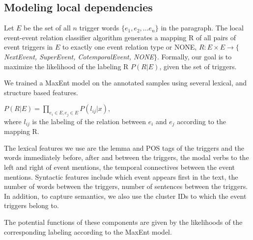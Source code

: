 \subsection{Modeling local dependencies}
Let $E$ be the set of all $n$ trigger words $\{e_1, e_2, ... e_{n}\}$ in the paragraph. The local event-event relation classifier algorithm generates a mapping R of all pairs of event triggers in $E$ to exactly one event relation type or NONE, $R : E \times E \rightarrow \{ $ {\em NextEvent, SuperEvent, CotemporalEvent, NONE}$ \}$. Formally, our goal is to maximize the likelihood of the labeling R $P(R | E)$, given the set of triggers.

We trained a MaxEnt model on the annotated samples using several lexical, and structure based features.

$P(R | E) = \prod_{e_{i}\in E, e_j \in E} P(l_{ij} | x), $\\
where $l_{ij}$ is the labeling of the relation between $e_i$ and $e_j$ according to the mapping R.

The lexical features we use are the lemma and POS tags of the triggers and the words immediately before, after and between the triggers, the modal verbs to the left and right of event mentions, the temporal connectives between the event mentions. Syntactic features include which event appears first in the text, the number of words between the triggers, number of sentences between the triggers. In addition, to capture semantics, we also use the cluster IDs to which the event triggers belong to.

The potential functions of these components are given by the likelihoods of the corresponding labeling according to the MaxEnt model.